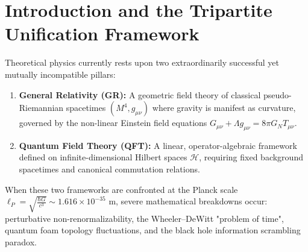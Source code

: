 \documentclass[11pt,a4paper,reqno]{amsart}
\theoremstyle{definition}
\numberwithin{equation}{section}
\begin{document}
\maketitle

\tableofcontents
\newpage

\section{Introduction and the Tripartite Unification Framework}
\label{sec:intro}

Theoretical physics currently rests upon two extraordinarily successful yet mutually incompatible pillars:
\begin{enumerate}[label=(\alph*)]
    \item \textbf{General Relativity (GR):} A geometric field theory of classical pseudo-Riemannian spacetimes $(M^4, g_{\mu\nu})$ where gravity is manifest as curvature, governed by the non-linear Einstein field equations $G_{\mu\nu} + \Lambda g_{\mu\nu} = 8\pi G_N T_{\mu\nu}$.
    \item \textbf{Quantum Field Theory (QFT):} A linear, operator-algebraic framework defined on infinite-dimensional Hilbert spaces $\mathscr{H}$, requiring fixed background spacetimes and canonical commutation relations.
\end{enumerate}

When these two frameworks are confronted at the Planck scale $\ell_P = \sqrt{\frac{\hbar G}{c^3}} \sim 1.616 \times 10^{-35}\text{ m}$, severe mathematical breakdowns occur: perturbative non-renormalizability, the Wheeler--DeWitt "problem of time", quantum foam topology fluctuations, and the black hole information scrambling paradox.
\end{document}
